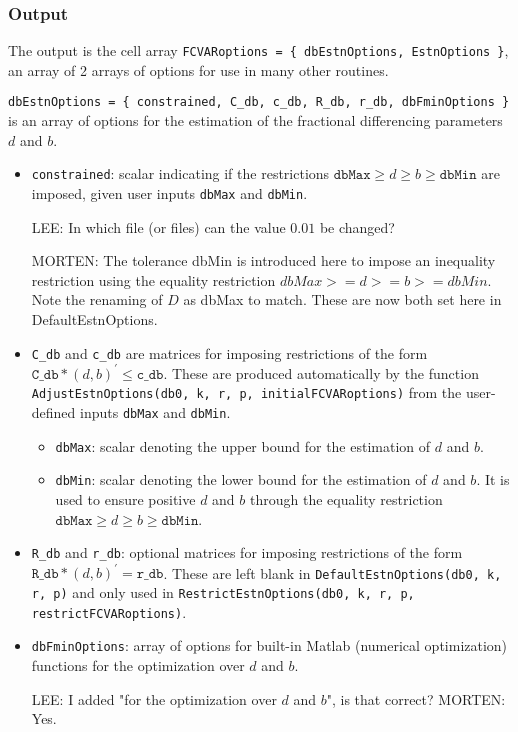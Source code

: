 \documentclass[12pt]{article}
\begin{document}
\subsubsection*{Output}
 
The output is the cell array \texttt{FCVARoptions = \{ dbEstnOptions, EstnOptions \}}, an array of 2 arrays of options for use in many other routines. 

\bigskip

\noindent \texttt{dbEstnOptions = \{ constrained, C\_db, c\_db, R\_db, r\_db, dbFminOptions \}} is an array of options for the estimation of the fractional differencing parameters $d$ and $b$.

\begin{itemize}

\item \texttt{constrained}: scalar indicating if the restrictions $\texttt{dbMax} \geq d \geq b \geq \texttt{dbMin}$ are imposed, given user inputs \texttt{dbMax} and \texttt{dbMin}. 

LEE: In which file (or files) can the value $0.01$ be changed?

MORTEN: The tolerance dbMin is introduced here to impose an inequality restriction using the equality restriction $dbMax >= d >= b >= dbMin$. Note the renaming of $D$ as dbMax to match. These are now both set here in DefaultEstnOptions.

\item \texttt{C\_db} and \texttt{c\_db} are matrices for imposing restrictions of the form $\texttt{C\_db} * (d, b)^{\prime} \leq \texttt{c\_db}$. These are produced automatically by the function  \texttt{AdjustEstnOptions(db0, k, r, p, initialFCVARoptions)} from the user-defined inputs \texttt{dbMax} and \texttt{dbMin}.

\begin{itemize}
\item \texttt{dbMax}: scalar denoting the upper bound for the estimation of $d$ and $b$. 
\item \texttt{dbMin}: scalar denoting the lower bound for the estimation of $d$ and $b$. It is used to ensure positive $d$ and $b$ through the equality restriction $\texttt{dbMax} \geq d \geq b \geq \texttt{dbMin}$. 
\end{itemize}

\item \texttt{R\_db} and \texttt{r\_db}: optional matrices for imposing restrictions of the form $\texttt{R\_db} * (d, b)^{\prime} = \texttt{r\_db}$. These are left blank in \texttt{DefaultEstnOptions(db0, k, r, p)} and only used in \texttt{RestrictEstnOptions(db0, k, r, p, restrictFCVARoptions)}.

\item \texttt{dbFminOptions}: array of options for built-in Matlab (numerical optimization) functions for the optimization over $d$ and $b$.

LEE: I added "for the optimization over $d$ and $b$", is that correct?
MORTEN: Yes.

\end{itemize}
\end{document}
